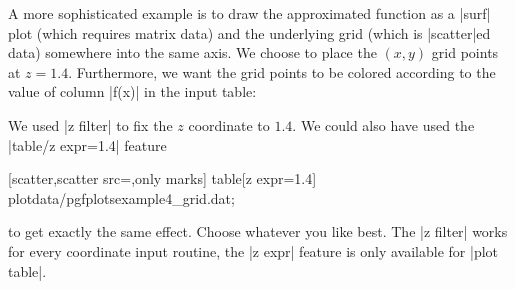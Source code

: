 A more sophisticated example is to draw the approximated function as a |surf| plot (which requires matrix data) and the underlying grid (which is |scatter|ed data) somewhere into the same axis. We choose to place the $(x,y)$ grid points at $z=1.4$. Furthermore, we want the grid points to be colored according to the value of column |f(x)| in the input table:
\pgfplotsexpensiveexample
\begin{codeexample}[]
\end{codeexample}
\noindent We used |z filter| to fix the $z$ coordinate to $1.4$. We could also have used the |table/z expr=1.4| feature
\begin{codeexample}
	[scatter,scatter src=,only marks] 
		table[z expr=1.4] {plotdata/pgfplotsexample4_grid.dat};
\end{codeexample}
\noindent to get exactly the same effect. Choose whatever you like best. The |z filter| works for every coordinate input routine, the |z expr| feature is only available for |plot table|.


